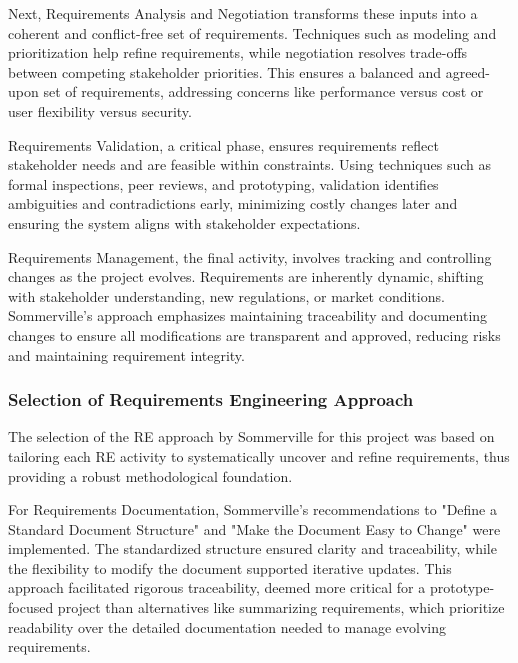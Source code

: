 Next, Requirements Analysis and Negotiation transforms these inputs into a coherent and conflict-free set of
requirements. Techniques such as modeling and prioritization help refine requirements, while negotiation resolves
trade-offs between competing stakeholder priorities. This ensures a balanced and agreed-upon set of requirements,
addressing concerns like performance versus cost or user flexibility versus security.
\autocite[cf.][p.112--113]{sommervilleRequirementsEngineeringGood1997}

Requirements Validation, a critical phase, ensures requirements reflect stakeholder needs and are feasible within
constraints. Using techniques such as formal inspections, peer reviews, and prototyping, validation identifies
ambiguities and contradictions early, minimizing costly changes later and ensuring the system aligns with stakeholder
expectations.\autocite[cf.][p.190--191]{sommervilleRequirementsEngineeringGood1997}

Requirements Management, the final activity, involves tracking and controlling changes as the project evolves.
Requirements are inherently dynamic, shifting with stakeholder understanding, new regulations, or market conditions.
Sommerville’s approach emphasizes maintaining traceability and documenting changes to ensure all modifications are
transparent and approved, reducing risks and maintaining requirement integrity.
\autocite[cf.][p.216--217]{sommervilleRequirementsEngineeringGood1997}

\subsubsection{Selection of Requirements Engineering Approach}

The selection of the \acs{RE} approach by Sommerville for this project was based on
tailoring each \acs{RE} activity to systematically uncover and refine requirements, thus providing a robust
methodological foundation.

For Requirements Documentation, Sommerville’s recommendations to "Define a Standard Document Structure" and "Make the
Document Easy to Change" were implemented. The standardized structure ensured clarity and traceability, while the
flexibility to modify the document supported iterative updates.
\autocite[cf.][p.41]{sommervilleRequirementsEngineeringGood1997}
\autocite[cf.][p.60]{sommervilleRequirementsEngineeringGood1997} This approach facilitated rigorous traceability, deemed
more critical for a prototype-focused project than alternatives like summarizing requirements, which prioritize
readability over the detailed documentation needed to manage evolving requirements.
\autocite[cf.][p.47]{sommervilleRequirementsEngineeringGood1997}

